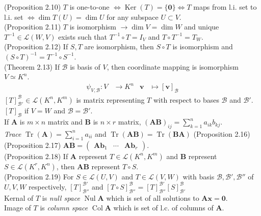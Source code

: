 \documentclass{article}
\theoremstyle{definition}
\DeclareMathOperator{\Ker}{Ker}
\DeclareMathOperator{\Tr}{Tr}
\DeclareMathOperator{\Nul}{Nul}
\DeclareMathOperator{\Col}{Col}
\begin{document}
(Proposition 2.10) $T$ is one-to-one $\Leftrightarrow\Ker(T)=\{\mathbf{0}\}\Leftrightarrow T$ maps from l.i. set to l.i. set $\Leftrightarrow \dim T(U)=\dim U$ for any subspace $U\subset V$.\\
(Proposition 2.11) $T$ is isomorphism $\rightarrow\dim V=\dim W$ and unique $T^{-1}\in\mathscr{L}(W,V)$ exists such that $T^{-1}\circ T=I_{V}$ and $T\circ T^{-1}=T_{W}$.\\
(Proposition 2.12) If $S,T$ are isomorphism, then $S\circ T$ is isomorphism and $(S\circ T)^{-1}=T^{-1}\circ S^{-1}$.\\
(Theorem 2.13) If $\mathcal{B}$ is basis of $V$, then coordinate mapping is isomorphism $V\simeq K^{n}$.
\begin{align*}
    \psi_{V,\mathcal{B}}:V&\rightarrow K^{n} & \mathbf{v}&\mapsto\left[\mathbf{v}\right]_{\mathcal{B}}
\end{align*}
$\left[T\right]_{\mathcal{B}'}^{\mathcal{B}}\in\mathscr{L}(K^{n},K^{m})$ is matrix representing $T$ with respect to bases $\mathcal{B}$ and $\mathcal{B}'$. $\left[T\right]_{\mathcal{B}}$ if $V=W$ and $\mathcal{B}=\mathcal{B}'$.\\
If $\mathbf{A}$ is $m\times n$ matrix and $\mathbf{B}$ is $n\times r$ matrix, $(\mathbf{AB})_{ij}=\sum_{k=1}^{n}a_{ik}b_{kj}$.\\
\textit{Trace} $\Tr(\mathbf{A})=\sum_{i=1}^{n}a_{ii}$ and $\Tr(\mathbf{AB})=\Tr(\mathbf{BA})$ (Proposition 2.16)\\
(Proposition 2.17) $\mathbf{AB}=\begin{pmatrix}
    \mathbf{Ab}_{1} & \cdots & \mathbf{Ab}_{r}
\end{pmatrix}$.\\
(Proposition 2.18) If $\mathbf{A}$ represent $T\in\mathscr{L}(K^{n},K^{m})$ and $\mathbf{B}$ represent $S\in\mathscr{L}(K^{r},K^{n})$, then $\mathbf{AB}$ represent $T\circ S$.\\
(Proposition 2.19) For $S\in\mathscr{L}(U,V)$ and $T\in\mathscr{L}(V,W)$ with basis $\mathcal{B},\mathcal{B}',\mathcal{B}''$ of $U,V,W$ respectively, $\left[T\right]_{\mathcal{B}''}^{\mathcal{B}'}$ and $\left[T\circ S\right]_{\mathcal{B}''}^{\mathcal{B}}=\left[T\right]_{\mathcal{B}''}^{\mathcal{B}'}\left[S\right]_{\mathcal{B}'}^{\mathcal{B}}$\\
Kernal of $T$ is \textit{null space} $\Nul\mathbf{A}$ which is set of all solutions to $\mathbf{Ax}=\mathbf{0}$.\\
Image of $T$ is \textit{column space} $\Col\mathbf{A}$ which is set of l.c. of columns of $\mathbf{A}$.\\
\end{document}
